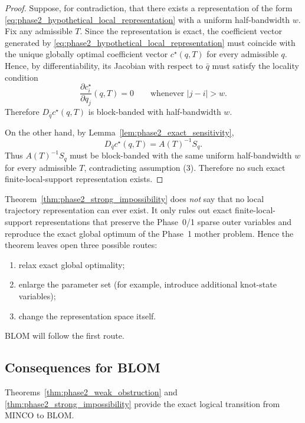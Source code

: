 \begin{proof}
Suppose, for contradiction, that there exists a representation of the form
\eqref{eq:phase2_hypothetical_local_representation} with a uniform half-bandwidth \(w\).
Fix any admissible \(T\).
Since the representation is exact, the coefficient vector generated by \eqref{eq:phase2_hypothetical_local_representation} must coincide with the unique globally optimal coefficient vector \(c^\star(q,T)\) for every admissible \(q\).
Hence, by differentiability, its Jacobian with respect to \(\bar q\) must satisfy the locality condition
\[
\frac{\partial c_i^\star}{\partial q_j}(q,T)=0
\qquad \text{whenever } |j-i|>w.
\]
Therefore \(D_{\bar q}c^\star(q,T)\) is block-banded with half-bandwidth \(w\).

On the other hand, by Lemma~\ref{lem:phase2_exact_sensitivity},
\[
D_{\bar q}c^\star(q,T)=A(T)^{-1}S_q.
\]
Thus \(A(T)^{-1}S_q\) must be block-banded with the same uniform half-bandwidth \(w\) for every admissible \(T\), contradicting assumption (3).
Therefore no such exact finite-local-support representation exists.
\end{proof}

\begin{remark}
\label{rem:phase2_scope_of_strong_theorem}
Theorem~\ref{thm:phase2_strong_impossibility} does \emph{not} say that no local trajectory representation can ever exist.
It only rules out exact finite-local-support representations that preserve the Phase~0/1 sparse outer variables and reproduce the exact global optimum of the Phase~1 mother problem.
Hence the theorem leaves open three possible routes:
\begin{enumerate}
    \item relax exact global optimality;
    \item enlarge the parameter set (for example, introduce additional knot-state variables);
    \item change the representation space itself.
\end{enumerate}
BLOM will follow the first route.
\end{remark}

\subsection{Consequences for BLOM}
\label{subsec:phase2_consequence_for_blom}

Theorems~\ref{thm:phase2_weak_obstruction} and \ref{thm:phase2_strong_impossibility} provide the exact logical transition from MINCO to BLOM.

